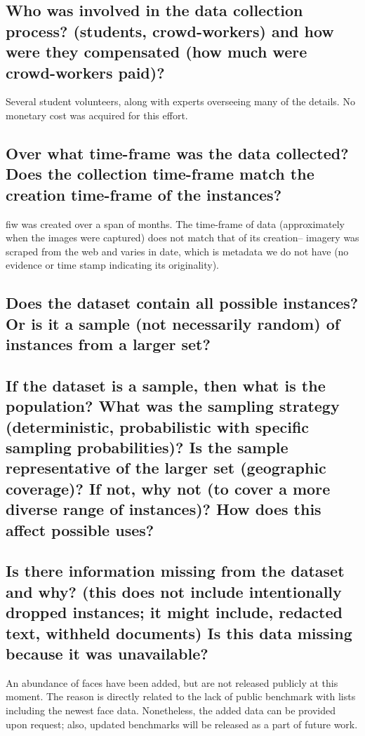 \subsection*{Who was involved in the data collection process? (\eg students, crowd-workers) and how were they compensated (\eg how much were crowd-workers paid)?}
\noindent Several student volunteers, along with experts overseeing many of the details. No monetary cost was acquired for this effort.

\subsection*{Over what time-frame was the data collected? Does the collection time-frame match the creation time-frame of the instances?}
\noindent
\gls{fiw} was created over a span of months. The time-frame of data (\ie approximately when the images were captured) does not match that of its creation-- imagery was scraped from the web and varies in date, which is metadata we do not have (\ie no evidence or time stamp indicating its originality).


\subsection*{Does the dataset contain all possible instances? Or is it a sample (not necessarily random) of instances from a larger set?}
\noindent
\subsection*{If the dataset is a sample, then what is the population? What was the sampling strategy (\eg deterministic, probabilistic with specific sampling probabilities)? Is the sample representative of the larger set (\eg geographic coverage)? If not, why not (\eg to cover a more diverse range of instances)? How does this affect possible uses?}
\noindent
\subsection*{Is there information missing from the dataset and why? (this does not include intentionally dropped instances; it might include, \eg redacted text, withheld documents) Is this data missing because it was unavailable?}
\noindent
An abundance of faces have been added, but are not released publicly at this moment. The reason is directly related to the lack of public benchmark with lists including the newest face data. Nonetheless, the added data can be provided upon request; also, updated benchmarks will be released as a part of future work.

